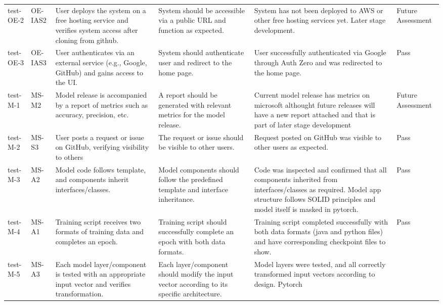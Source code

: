 \documentclass[12pt, titlepage]{article}
\begin{document}
\begin{longtable}[c]{|p{1.5cm}|p{1.5cm}|p{2.5cm}|p{2.5cm}|p{2.5cm}|p{1.5cm}|}
    \hline
    test-OE-2 & OE-IAS2 & User deploys the system on a free hosting service
    and verifies system access after cloning from github. & System should be 
    accessible via a public URL and function as 
    expected. & System has not been deployed to AWS or other free hosting 
    services yet. Later stage development. 
    & Future Assessment \\
    test-OE-3 & OE-IAS3 & User authenticates via an external service (e.g., Google, GitHub) 
    and gains access to the UI. & System should authenticate user and redirect to 
    the home page. & User successfully authenticated via Google through Auth Zero 
    and was redirected to the home page. & Pass \\
    \hline
    test-M-1 & MS-M2 & Model release is accompanied by a report of metrics such as 
    accuracy, precision, etc. & A report should be generated with relevant metrics 
    for the model release. & Current model release has metrics on microsoft
    althought future releases will have a new report attached and that is part of later stage development & Future Assessment \\
    \hline
    test-M-2 & MS-S3 & User posts a request or issue on GitHub, verifying visibility
     to others & The request or issue should be visible to other users. & Request 
     posted on GitHub was visible to other users as expected. & Pass \\
    \hline
    test-M-3 & MS-A2 & Model code follows template, and components inherit 
    interfaces/classes. & Model components should follow the predefined template 
    and interface inheritance. & Code was inspected and confirmed that all 
    components inherited from interfaces/classes as required. Model app structure
    follows SOLID principles and model itself is masked in pytorch. & Pass \\
    \hline
    test-M-4 & MS-A1 & Training script receives two formats of training data 
    and completes an epoch. & Training script should successfully complete an 
    epoch with both data formats. & Training script completed successfully with 
    both data formats (java and python files) and have corresponding checkpoint
    files to show. & Pass \\
    \hline
    test-M-5 & MS-A3 & Each model layer/component is tested with an appropriate 
    input vector and verifies transformation. & Each layer/component should modify 
    the input vector according to its specific architecture. & Model layers were 
    tested, and all correctly transformed input vectors according to design. Pytorch 

\end{longtable}
\end{document}
